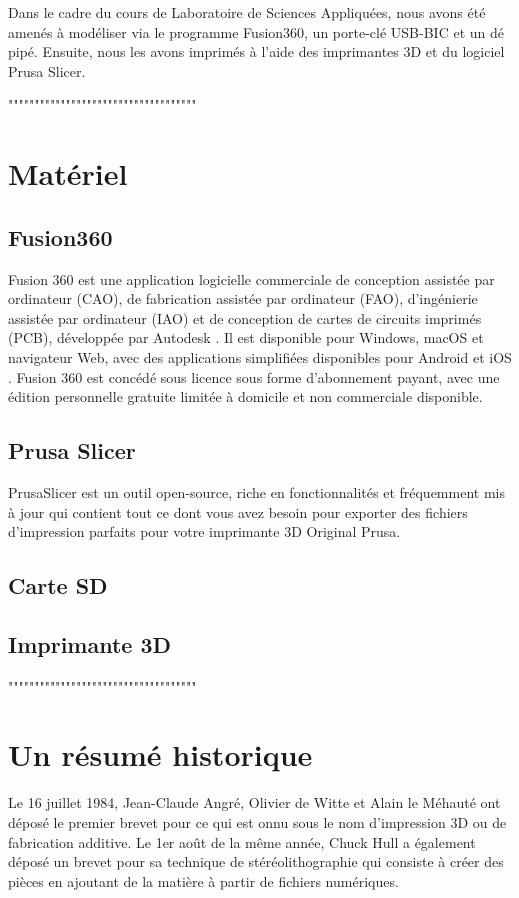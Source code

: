 \documentclass[12pt, letterpaper]{report}
\begin{document}
Dans le cadre du cours de Laboratoire de Sciences Appliquées, nous avons été amenés à modéliser via le programme Fusion360, un porte-clé USB-BIC et un dé pipé. Ensuite, nous les avons imprimés à l'aide des imprimantes 3D et du logiciel Prusa Slicer.


""""""""""""""""""""""""""""""""""""
\chapter{Matériel}
\section{Fusion360}

Fusion 360 est une application logicielle commerciale de conception assistée par ordinateur (CAO), de fabrication assistée par ordinateur (FAO), d'ingénierie assistée par ordinateur (IAO) et de conception de cartes de circuits imprimés (PCB), développée par Autodesk . Il est disponible pour Windows, macOS et navigateur Web, avec des applications simplifiées disponibles pour Android et iOS . Fusion 360 est concédé sous licence sous forme d'abonnement payant, avec une édition personnelle gratuite limitée à domicile et non commerciale disponible.

\section{Prusa Slicer}

PrusaSlicer est un outil open-source, riche en fonctionnalités et fréquemment mis à jour qui contient tout ce dont vous avez besoin pour exporter des fichiers d'impression parfaits pour votre imprimante 3D Original Prusa.

\section{Carte SD}



\section{Imprimante 3D}
""""""""""""""""""""""""""""""""""""

\chapter{Un résumé historique}

Le 16 juillet 1984, Jean-Claude Angré, Olivier de Witte et Alain le Méhauté ont déposé le premier brevet pour ce qui est onnu sous le nom d'impression 3D ou de fabrication additive. Le 1er août de la même année, Chuck Hull a également déposé un brevet pour sa technique de stéréolithographie qui consiste à créer des pièces en ajoutant de la matière à partir de fichiers numériques.
\end{document}
